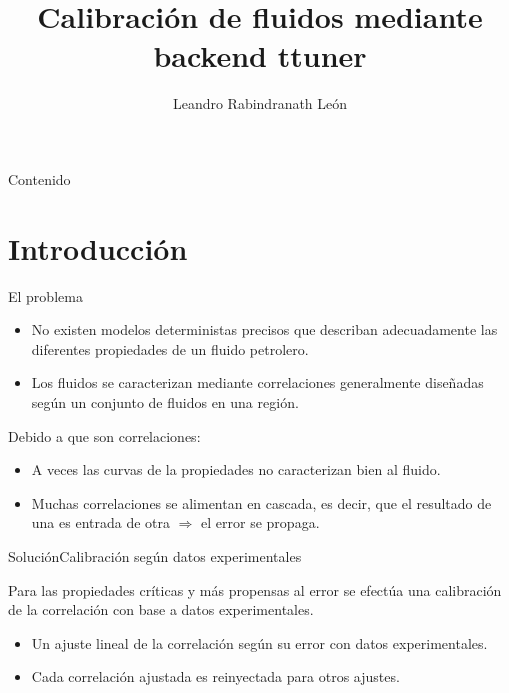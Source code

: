 \documentclass{beamer}
\institute[ULA]{Universidad de Los Andes}
\author{Leandro Rabindranath León}
\title{Calibración de fluidos mediante backend ttuner}
\begin{document}
 \begin{frame}
  \maketitle 
 \end{frame}

 \begin{frame}{Contenido}
  \tableofcontents
 \end{frame}

\section{Introducción}

 \begin{frame}{El problema}
  
  \begin{block}{}
   \begin{itemize}
    \item No existen modelos deterministas precisos que describan adecuadamente
	  las diferentes propiedades de un fluido petrolero.

    \item Los fluidos se caracterizan mediante correlaciones generalmente
	  diseñadas según un conjunto de fluidos en una región.

   \end{itemize}
   
   Debido a que son correlaciones:

   \begin{itemize}
    \item A veces las curvas de la propiedades no caracterizan bien al
	  fluido.

    \item Muchas correlaciones se alimentan en cascada, es decir, que el
	  resultado de una es entrada de otra $\Rightarrow$ el error se
	  propaga.
   \end{itemize}

  \end{block}
 \end{frame}

 \begin{frame}{Solución}{Calibración según datos experimentales}

  Para las propiedades críticas y más propensas al error se efectúa una
  calibración de la correlación con base a datos experimentales.

  \begin{itemize}
   \item Un ajuste lineal de la correlación según su error con datos
	 experimentales.
	 
   \item Cada correlación ajustada es reinyectada para otros ajustes.
  \end{itemize}

 \end{frame}
\end{document}
